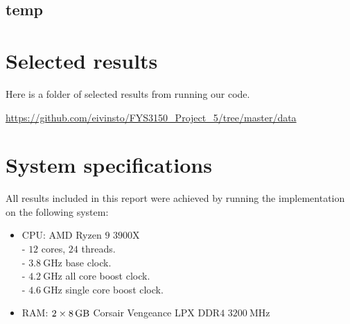 \documentclass[reprint,english,notitlepage]{revtex4-1}  %
\begin{document}
\cprotect\subsection{temp} \label{A.1}

\clearpage
\section{Selected results} \label{B}
Here is a folder of selected results from running our code.

\url{https://github.com/eivinsto/FYS3150_Project_5/tree/master/data}

\newpage
\section{System specifications} \label{C}
All results included in this report were achieved by running the implementation on the following system:

\begin{itemize}
	\item CPU: AMD Ryzen \(9\) \(3900\)X \\
		- \(12\) cores, \(24\) threads. \\ 
		- \(\SI{3.8}{\giga\hertz}\) base clock. \\
		- \(\SI{4.2}{\giga\hertz}\) all core boost clock. \\
		- \(\SI{4.6}{\giga\hertz}\) single core boost clock. \\
	\item RAM: \(2\times\SI{8}{\giga\byte}\) Corsair Vengeance LPX DDR\(4\) \(\SI{3200}{\mega\hertz}\)
\end{itemize}
\end{document}
